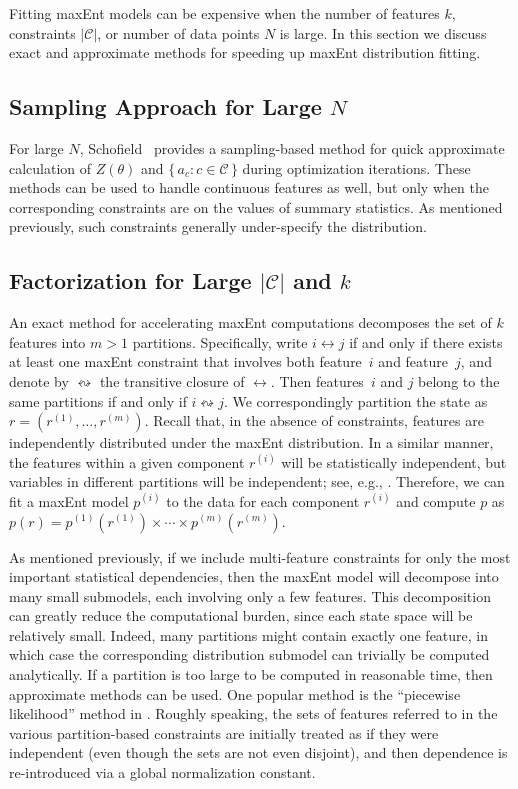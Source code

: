 \documentclass[11pt]{article}
\newcommand{\xC}{\mathcal{C}}
\begin{document}
Fitting maxEnt models can be expensive when the number of features $k$, constraints $|\xC|$, or number of data points $N$ is large. In this section we discuss exact and approximate methods for speeding up maxEnt distribution fitting.

\subsection{Sampling Approach for Large $N$}

For large $N$, Schofield~\cite{Schofield04} provides a sampling-based method for quick approximate calculation of $Z(\theta)$ and $\{\,a_c:c\in\xC\,\}$ during optimization iterations.  These methods can be used to handle continuous features as well, but only when the corresponding constraints are on the values of summary statistics. As mentioned previously, such constraints generally under-specify the distribution.

\subsection{Factorization for Large $|\xC|$ and $k$}\label{sec:factor}

An exact method for accelerating maxEnt computations decomposes the set of $k$ features into $m>1$ partitions. Specifically, write $i\leftrightarrow j$ if and only if there exists at least one maxEnt constraint that involves both feature~$i$ and feature~$j$, and denote by $\leftrightsquigarrow$ the transitive closure of $\leftrightarrow$. Then features~$i$ and $j$ belong to the same partitions if and only if $i\leftrightsquigarrow j$. We correspondingly partition the state as $r=(r^{(1)},\ldots,r^{(m)})$. Recall that, in the absence of constraints, features are independently distributed under the maxEnt distribution. In a similar manner, the features within a given component $r^{(i)}$ will be statistically independent, but variables in different partitions will be independent; see, e.g., \cite[App.~B]{Markl2007}. Therefore, we can fit a maxEnt model $p^{(i)}$ to the data for each component $r^{(i)}$ and compute $p$ as $p(r)=p^{(1)}(r^{(1)})\times\cdots\times p^{(m)}(r^{(m)})$.

As mentioned previously, if we include multi-feature constraints for only the most important statistical dependencies, then the maxEnt model will decompose into many small submodels, each involving only a few features. This decomposition can greatly reduce the computational burden, since each state space will be relatively small. Indeed, many partitions might contain exactly one feature, in which case the corresponding distribution submodel can trivially be computed analytically. If a partition is too large to be computed in reasonable time, then approximate methods can be used. One popular method is the ``piecewise likelihood'' method in \cite{Sutton2007}. Roughly speaking, the sets of features referred to in the various partition-based constraints are initially treated as if they were independent (even though the sets are not even disjoint), and then dependence is re-introduced via a global normalization constant.
\end{document}
